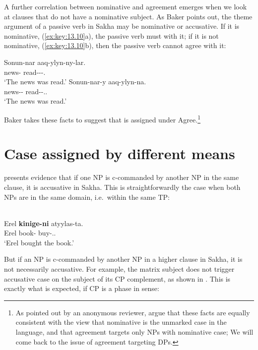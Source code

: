 \documentclass[output=paper]{langsci/langscibook}
\begin{document}
A further correlation between nominative and agreement emerges when we look at
clauses that do not have a nominative subject. As Baker points out, the theme
argument of a passive verb in Sakha may be nominative or accusative. If it is
nominative, (\ref{ex:key:13.10}a), the passive verb must  with it; if it
is not nominative, (\ref{ex:key:13.10}b), then the passive verb cannot agree
with it:

\ea%
    \label{ex:key:13.10} \parencite[32]{Baker2015}
	\ea
	\gll  Sonun-nar aaq-ylyn-ny-lar.\\
    news-\Pl{}  read-\Pass{}-\Pst{}-\Tpl.\Sbj{}\\
	\glt     ‘The news was read.’
	\ex
	\gll  Sonun-nar-y aaq-ylyn-na.\\
	    news-\Pl{}-\Acc{}  read-\Pass{}-\Pst{}.\Tsg.\Sbj{}\\
	\glt     ‘The news was read.’
    \z
\z

Baker takes these facts to suggest that \Nom{} is assigned under
Agree.\footnote{As pointed out by an anonymous reviewer, \citet{LevPre2015}
    argue that these facts are equally consistent with the view that
    nominative is the unmarked case in the language, and
    that agreement targets only NPs with nominative case;
We will come back to the issue of agreement targeting \Nom{} DPs.}

\section{Case assigned by different means}\label{sec:key:13.3}

\textcite[112f.]{Baker2015} presents evidence that if one NP is c-commanded by
another NP in the same clause, it is accusative in Sakha. This is
straightforwardly the case when both NPs are in the same domain, i.e.\ within
the same TP:

\ea%
    \label{ex:key:13.11} \parencite[112]{Baker2015}\\
    \gll  Erel  \textbf{kinige-ni}  atyylas-ta.\\
          Erel book-\Acc{}  buy-\Pst{}.\Tsg.\Sbj{}\\
    \glt  ‘Erel bought the book.’
\z

But if an NP is c-commanded by another NP in a higher clause in Sakha, it is
not necessarily accusative. For example, the matrix subject does not trigger
accusative case on the subject of its CP complement, as shown in
. This is exactly what is expected, if CP is a
phase in  sense:
\end{document}

